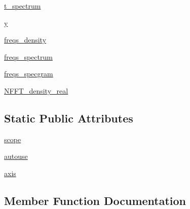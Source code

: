 \begin{DoxyCompactItemize}
\item 
\hyperlink{classmatplotlib_1_1tests_1_1test__mlab_1_1TestSpectral_a60945fa55f6975db4fdea98542570c38}{t\+\_\+spectrum}
\item 
\hyperlink{classmatplotlib_1_1tests_1_1test__mlab_1_1TestSpectral_a341b0f8c6838e447962152e6e1660af9}{y}
\item 
\hyperlink{classmatplotlib_1_1tests_1_1test__mlab_1_1TestSpectral_aa617b82792a3760b3cac42add18679b5}{freqs\+\_\+density}
\item 
\hyperlink{classmatplotlib_1_1tests_1_1test__mlab_1_1TestSpectral_a6439789bc8e2c829a5d0350dfa36c388}{freqs\+\_\+spectrum}
\item 
\hyperlink{classmatplotlib_1_1tests_1_1test__mlab_1_1TestSpectral_a20039d8e45c67f56495ed8118218ccff}{freqs\+\_\+specgram}
\item 
\hyperlink{classmatplotlib_1_1tests_1_1test__mlab_1_1TestSpectral_a8f04a96eb68267695906e5de3876073d}{N\+F\+F\+T\+\_\+density\+\_\+real}
\end{DoxyCompactItemize}
\subsection*{Static Public Attributes}
\begin{DoxyCompactItemize}
\item 
\hyperlink{classmatplotlib_1_1tests_1_1test__mlab_1_1TestSpectral_ae3f9d6d692aa1e2dfe3614fc335c60a4}{scope}
\item 
\hyperlink{classmatplotlib_1_1tests_1_1test__mlab_1_1TestSpectral_a4396166b822601356c5a9191eb799915}{autouse}
\item 
\hyperlink{classmatplotlib_1_1tests_1_1test__mlab_1_1TestSpectral_a85fb77a0ee7d2ffcb8f72ac2cdbacb65}{axis}
\end{DoxyCompactItemize}


\subsection{Member Function Documentation}
\mbox{\label{classmatplotlib_1_1tests_1_1test__mlab_1_1TestSpectral_a8469a31b01665bb78001a3b8f2f372c6}} 
